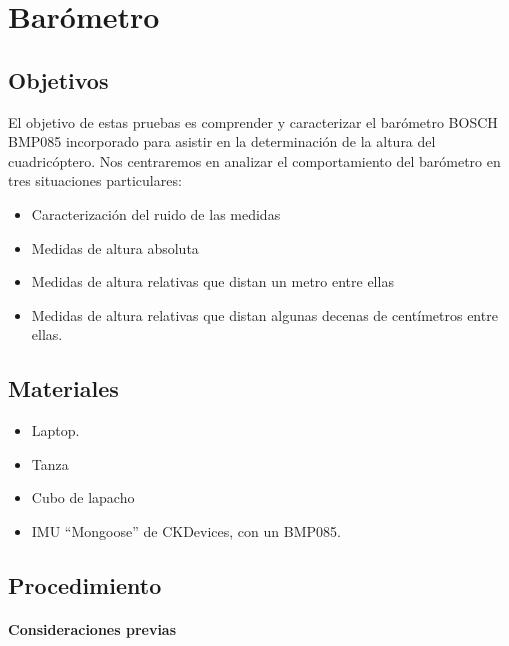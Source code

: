 \documentclass[spanish,12pt,a4paper,titlepage]{report}
\begin{document}
\chapter{Barómetro}
\label{chap:barometro}

\section{Objetivos}

El objetivo de estas pruebas es comprender y caracterizar el barómetro BOSCH BMP085 incorporado para asistir en la determinación de la altura del cuadricóptero. Nos centraremos en analizar el comportamiento del barómetro en tres situaciones particulares:

\begin{itemize}
\item Caracterización del ruido de las medidas
\item Medidas de altura absoluta
\item Medidas de altura relativas que distan un metro entre ellas
\item Medidas de altura relativas que distan algunas decenas de centímetros entre ellas. 
\end{itemize}

\section{Materiales}
\label{sec:materiales}

\begin{itemize}
\item Laptop.
\item Tanza
\item Cubo de lapacho
\item IMU ``Mongoose'' de CKDevices, con un BMP085.

\end{itemize}

\newpage
\section{Procedimiento}
\label{sec:procedimiento}

\subsubsection*{Consideraciones previas}
\label{consideraciones}
\end{document}
